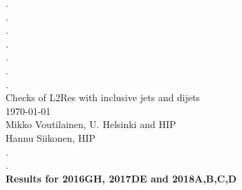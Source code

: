 \documentclass[landscape,10pt]{beamer} %
\begin{document}
\begin{centering}
{. }\\
{. }\\
{. }\\
{. }\\
{. }\\
{. }\\
{. }\\
Checks of L2Res with inclusive jets and dijets\\
\today\\
Mikko Voutilainen, U. Helsinki and HIP\\
Hannu Siikonen, HIP\\
{. }\\
{. }\\
{\bf Results for 2016GH, 2017DE and 2018A,B,C,D}\\
\end{centering}

\newpage
\end{document}
